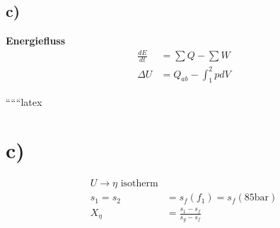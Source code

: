 

\subsection*{c)}
\textbf{Energiefluss}
\begin{align*}
    \frac{dE}{dt} &= \sum Q - \sum W \\
    \Delta U &= Q_{ab} - \int_{1}^{2} p dV
\end{align*}

``````latex



\section*{c)}
\begin{align*}
U \rightarrow \eta \text{ isotherm} \\
s_1 = s_2 &= s_f (f_1) = s_f (85 \text{bar}) \\
X_\eta &= \frac{s_1 - s_f}{s_g - s_f}
\end{align*}